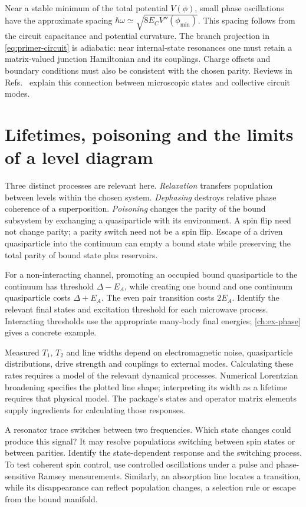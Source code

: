 Near a stable minimum of the total potential $V(\phi)$, small phase oscillations
have the approximate spacing $\hbar\omega\simeq\sqrt{8E_CV''(\phi_{\min})}$.
This spacing follows from the circuit capacitance and potential curvature.
The branch projection in
\cref{eq:primer-circuit} is adiabatic: near internal-state resonances one must
retain a matrix-valued junction Hamiltonian and its couplings. Charge offsets
and boundary conditions must also be consistent with the chosen parity.
Reviews in Refs.~\cite{aguado2020perspective,glazman2021bogoliubov} explain this
connection between microscopic states and collective circuit modes.

\section{Lifetimes, poisoning and the limits of a level diagram}

Three distinct processes are relevant here. \emph{Relaxation} transfers population
between levels within the chosen system. \emph{Dephasing} destroys relative
phase coherence of a superposition. \emph{Poisoning} changes the parity of the
bound subsystem by exchanging a quasiparticle with its environment. A spin flip
need not change parity; a parity switch need not be a spin flip. Escape of a
driven quasiparticle into the continuum can empty a bound state while preserving
the total parity of bound state plus reservoirs.

For a non-interacting channel, promoting an occupied bound quasiparticle to the
continuum has threshold $\Delta-E_A$, while creating one bound and one continuum
quasiparticle costs $\Delta+E_A$. The even pair transition costs $2E_A$.
Identify the relevant final states and excitation threshold for each microwave
process. Interacting thresholds use the appropriate
many-body final energies; \cref{ch:ex-phase} gives a concrete example.

Measured $T_1$, $T_2$ and line widths depend on electromagnetic noise,
quasiparticle distributions, drive strength and couplings to external modes.
Calculating these rates requires a model of the relevant dynamical processes.
Numerical Lorentzian broadening specifies the plotted line shape; interpreting
its width as a lifetime requires that physical model. The package's states and
operator matrix elements supply ingredients for calculating those responses.

\begin{physics}
A resonator trace switches between two frequencies. Which state changes could
produce this signal? It may resolve populations switching between spin states or
between parities. Identify the state-dependent response and the switching
process. To test coherent spin control, use controlled oscillations under a pulse and phase-sensitive
Ramsey measurements. Similarly, an absorption line
locates a transition, while its disappearance can reflect population changes,
a selection rule or escape from the bound manifold.
\end{physics}


